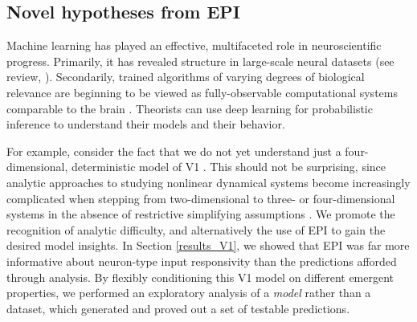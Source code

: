\documentclass[11pt]{article}
\begin{document}
\subsection{Novel hypotheses from EPI} 
Machine learning has played an effective, multifaceted role in neuroscientific progress. 
Primarily, it has revealed structure in large-scale neural datasets \cite{kass2001spike, brown1998statistical, paninski2004maximum, byron2009gaussian, latimer2015single, duncker2019learning} (see review, \cite{paninski2018neural}).  
Secondarily, trained algorithms of varying degrees of biological relevance are beginning to be viewed as fully-observable computational systems comparable to the brain \cite{ sussillo2013opening, richards2019deep}.  
Theorists can use deep learning for probabilistic inference to understand their models and their behavior.

For example, consider the fact that we do not yet understand just a four-dimensional, deterministic model of V1 \cite{litwin2016inhibitory}.  
This should not be surprising, since analytic approaches to studying nonlinear dynamical systems become increasingly complicated when stepping from two-dimensional to three- or four-dimensional systems in the absence of restrictive simplifying assumptions \cite{strogatz1994nonlinear}. 
We promote the recognition of analytic difficulty, and alternatively the use of EPI to gain the desired model insights.
In Section \ref{results_V1}, we showed that EPI was far more informative about neuron-type input responsivity than the predictions afforded through analysis.
By flexibly conditioning this V1 model on different emergent properties, we performed an exploratory analysis of a \emph{model} rather than a dataset, which generated and proved out a set of testable predictions.
\end{document}
